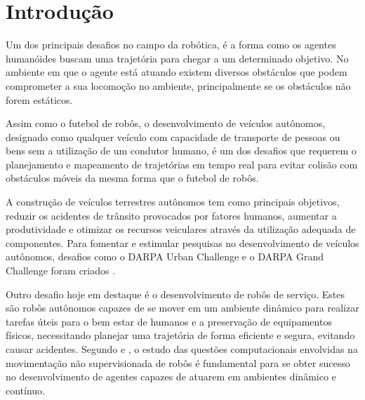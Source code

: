 \chapter{Introdu\c{c}\~ao}
Um dos principais desafios no campo da robótica, é a forma como os agentes humanóides buscam uma trajetória para chegar a 
um determinado objetivo. No ambiente em que o agente está atuando existem diversos obstáculos que podem comprometer 
a sua locomoção no ambiente, principalmente se os obstáculos não forem estáticos.

Assim como o futebol de robôs, o desenvolvimento de veículos autônomos, designado como qualquer veículo com capacidade de
transporte de pessoas ou bens sem a utilização de um condutor humano, é um dos desafios que requerem o planejamento e mapeamento de 
trajetórias em tempo real para evitar colisão com obstáculos móveis da mesma forma que o futebol de robôs.

A construção de veículos terrestres
autônomos tem como principais objetivos, reduzir os acidentes de trânsito provocados por fatores humanos, aumentar a produtividade 
e otimizar os recursos veiculares através da utilização adequada de componentes. Para fomentar e estimular pesquisas no 
desenvolvimento de veículos autônomos, desafios como o DARPA Urban Challenge e o DARPA Grand Challenge foram criados \cite{darpa}.

Outro desafio hoje em destaque é o desenvolvimento de robôs de serviço. Estes são robôs autônomos capazes de se mover em um ambiente 
dinâmico para realizar tarefas úteis para o bem estar de humanos e a preservação de equipamentos físicos, necessitando planejar uma 
trajetória de forma eficiente e segura, evitando causar acidentes. Segundo  e , o estudo das
questões computacionais envolvidas na movimentação não supervisionada de robôs é fundamental para se obter sucesso no 
desenvolvimento de agentes capazes de atuarem em ambientes dinâmico e contínuo.


